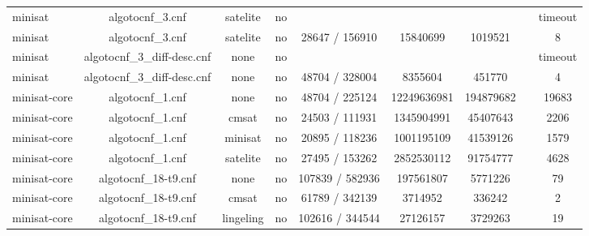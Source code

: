 \begin{appendices}
\begin{table}[p]
\begin{center}
\begin{tabular}{l|cccccccc}
  minisat                        & algotocnf\_3.cnf               & satelite   & no    &            &           &           &            & timeout \\ %
  minisat                        & algotocnf\_3.cnf               & satelite   & no    & 28647 / 156910 & 15840699  & 1019521   &            & 8 \\ %
  minisat                        & algotocnf\_3\_diff-desc.cnf    & none       & no    &            &           &           &            & timeout \\ %
  minisat                        & algotocnf\_3\_diff-desc.cnf    & none       & no    & 48704 / 328004 & 8355604   & 451770    &            & 4 \\ %
  minisat-core                   & algotocnf\_1.cnf               & none       & no    & 48704 / 225124 & 12249636981 & 194879682 &            & 19683 \\ %
  minisat-core                   & algotocnf\_1.cnf               & cmsat      & no    & 24503 / 111931 & 1345904991 & 45407643  &            & 2206 \\ %
  minisat-core                   & algotocnf\_1.cnf               & minisat    & no    & 20895 / 118236 & 1001195109 & 41539126  &            & 1579 \\ %
  minisat-core                   & algotocnf\_1.cnf               & satelite   & no    & 27495 / 153262 & 2852530112 & 91754777  &            & 4628 \\ %
  minisat-core                   & algotocnf\_18-t9.cnf           & none       & no    & 107839 / 582936 & 197561807 & 5771226   &            & 79 \\ %
  minisat-core                   & algotocnf\_18-t9.cnf           & cmsat      & no    & 61789 / 342139 & 3714952   & 336242    &            & 2 \\ %
  minisat-core                   & algotocnf\_18-t9.cnf           & lingeling  & no    & 102616 / 344544 & 27126157  & 3729263   &            & 19 \\ %

\end{tabular}
\end{center}
\end{table}
\end{appendices}
